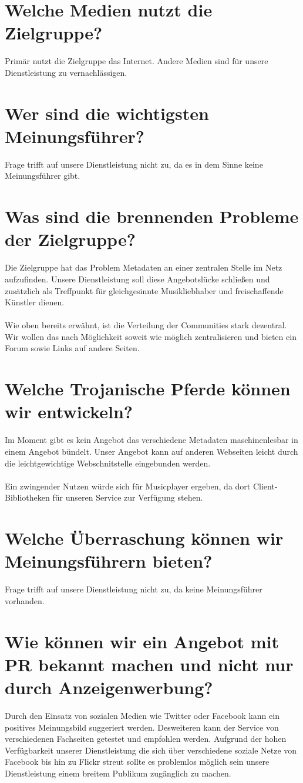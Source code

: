 \section{Welche Medien nutzt die Zielgruppe?}
Primär nutzt die Zielgruppe das Internet. Andere Medien sind für unsere
Dienstleistung zu vernachlässigen.

\section{Wer sind die wichtigsten Meinungsführer?}
Frage trifft auf unsere Dienstleistung nicht zu, da es in dem Sinne keine
Meinungsführer gibt.

\section{Was sind die brennenden Probleme der Zielgruppe?}
Die Zielgruppe hat das Problem Metadaten an einer zentralen Stelle im Netz
aufzufinden. Unsere Dienstleistung soll diese Angebotslücke schließen und
zusätzlich als Treffpunkt für gleichgesinnte Musikliebhaber und freischaffende
Künstler dienen.
\\
\\
Wie oben bereits erwähnt, ist die Verteilung der Communities stark dezentral. Wir wollen
das nach Möglichkeit soweit wie möglich zentralisieren und bieten ein Forum 
sowie Links auf andere Seiten.


\section{Welche Trojanische Pferde können wir entwickeln?}
Im Moment gibt es kein Angebot das verschiedene Metadaten maschinenlesbar 
in einem Angebot bündelt. Unser Angebot kann auf anderen Webseiten leicht durch
die leichtgewichtige Webschnitstelle eingebunden werden.
\\
\\
Ein zwingender Nutzen würde sich für Musicplayer ergeben, da dort 
Client-Bibliotheken für unseren Service zur Verfügung stehen.

\section{Welche Überraschung können wir Meinungsführern bieten?}
Frage trifft auf unsere Dienstleistung nicht zu, da keine Meinungsführer
vorhanden.

\section{Wie können wir ein Angebot mit PR bekannt machen und nicht nur durch Anzeigenwerbung?}
Durch den Einsatz von sozialen Medien wie Twitter oder Facebook kann ein
positives Meinungsbild suggeriert werden. Desweiteren kann der Service von
verschiedenen Fachseiten getestet und empfohlen werden. Aufgrund der hohen 
Verfügbarkeit unserer Dienstleistung die sich über verschiedene soziale Netze
von Facebook bis hin zu Flickr streut sollte es problemlos möglich sein unsere
Dienstleistung einem breitem Publikum zugänglich zu machen.

